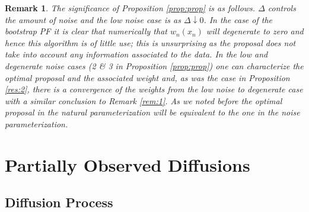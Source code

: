 \documentclass[english,13pt]{article}
\numberwithin{equation}{section}
\newtheorem{rem}{Remark}[section]
\begin{document}
\begin{rem}\label{rem:rmk_lin}
The significance of Proposition \ref{prop:prop} is as follows.  $\Delta$ controls the amount of noise and the low noise case is as $\Delta\downarrow 0$.   In the case of the bootstrap PF it is clear that numerically that $w_n(x_n)$ will degenerate to zero and hence this algorithm is of little use; this is unsurprising as the proposal does not take into account any information associated to the data.  In the low and degenerate noise cases (2 \& 3 in Proposition \ref{prop:prop}) one can characterize the optimal proposal and the associated weight and, as was the case in Proposition \ref{res:2},  there is a convergence of the weights from the low noise to degenerate case with a similar conclusion to Remark \ref{rem:1}.  As we noted before the optimal proposal in the natural parameterization will be equivalent to the one in the noise parameterization. 
\end{rem}

\section{Partially Observed Diffusions}\label{sec:diff}

\subsection{Diffusion Process}
\end{document}
